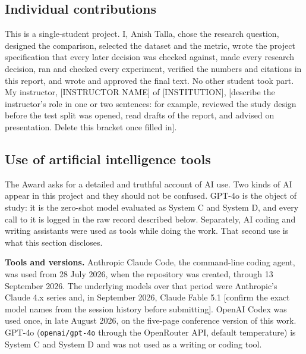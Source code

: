 \documentclass[12pt,letterpaper]{article}
\begin{document}
\subsection*{Individual contributions}

This is a single-student project. I, Anish Talla, chose the research
question, designed the comparison, selected the dataset and the metric,
wrote the project specification that every later decision was checked
against, made every research decision, ran and checked every experiment,
verified the numbers and citations in this report, and wrote and approved
the final text. No other student took part. My instructor,
[INSTRUCTOR NAME] of [INSTITUTION], [describe the instructor's role in one
or two sentences: for example, reviewed the study design before the test
split was opened, read drafts of the report, and advised on presentation.
Delete this bracket once filled in].

\subsection*{Use of artificial intelligence tools}

The Award asks for a detailed and truthful account of AI use. Two kinds of
AI appear in this project and they should not be confused. GPT-4o is the
object of study: it is the zero-shot model evaluated as System C and
System D, and every call to it is logged in the raw record described
below. Separately, AI coding and writing assistants were used as tools
while doing the work. That second use is what this section discloses.

\textbf{Tools and versions.} Anthropic Claude Code, the command-line
coding agent, was used from 28 July 2026, when the repository was created,
through 13 September 2026. The underlying models over that period were
Anthropic's Claude 4.x series and, in September 2026, Claude Fable 5.1
[confirm the exact model names from the session history before
submitting]. OpenAI Codex was used once, in late August 2026, on the
five-page conference version of this work. GPT-4o (\texttt{openai/gpt-4o}
through the OpenRouter API, default temperature) is System C and System D
and was not used as a writing or coding tool.
\end{document}
